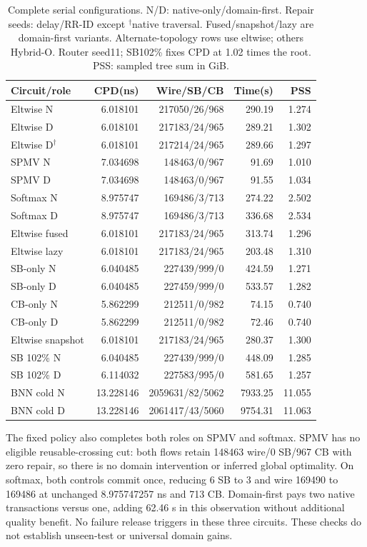 \documentclass[conference,10pt]{IEEEtran}
\begin{document}
\begin{table}[t]
\centering\footnotesize\setlength{\tabcolsep}{3pt}
\caption{Complete serial configurations. N/D: native-only/domain-first. Repair seeds: delay/RR-ID except $^\dagger$native traversal. Fused/snapshot/lazy are domain-first variants. Alternate-topology rows use eltwise; others Hybrid-O. Router seed11; SB102\% fixes CPD at 1.02 times the root. PSS: sampled tree sum in GiB.}
\label{tab:completecost}
\begin{tabular}{lrrrr}\hline
Circuit/role & CPD(ns) & Wire/SB/CB & Time(s) & PSS\\\hline
Eltwise N&6.018101&217050/26/968&290.19&1.274\\
Eltwise D&6.018101&217183/24/965&289.21&1.302\\
Eltwise D$^\dagger$&6.018101&217214/24/965&289.66&1.297\\
SPMV N&7.034698&148463/0/967&91.69&1.010\\
SPMV D&7.034698&148463/0/967&91.55&1.034\\
Softmax N&8.975747&169486/3/713&274.22&2.502\\
Softmax D&8.975747&169486/3/713&336.68&2.534\\
Eltwise fused&6.018101&217183/24/965&313.74&1.296\\
Eltwise lazy&6.018101&217183/24/965&203.48&1.310\\
SB-only N&6.040485&227439/999/0&424.59&1.271\\
SB-only D&6.040485&227459/999/0&533.57&1.282\\
CB-only N&5.862299&212511/0/982&74.15&0.740\\
CB-only D&5.862299&212511/0/982&72.46&0.740\\
Eltwise snapshot&6.018101&217183/24/965&280.37&1.300\\
SB 102\% N&6.040485&227439/999/0&448.09&1.285\\
SB 102\% D&6.114032&227583/995/0&581.65&1.257\\
BNN cold N&13.228146&2059631/82/5062&7933.25&11.055\\
BNN cold D&13.228146&2061417/43/5060&9754.31&11.063\\\hline
\end{tabular}
\end{table}

The fixed policy also completes both roles on SPMV and softmax. SPMV has no eligible reusable-crossing cut: both flows retain 148463 wire/0 SB/967 CB with zero repair, so there is no domain intervention or inferred global optimality. On softmax, both controls commit once, reducing 6 SB to 3 and wire 169490 to 169486 at unchanged 8.975747257 ns and 713 CB. Domain-first pays two native transactions versus one, adding 62.46 s in this observation without additional quality benefit. No failure release triggers in these three circuits. These checks do not establish unseen-test or universal domain gains.
\end{document}

